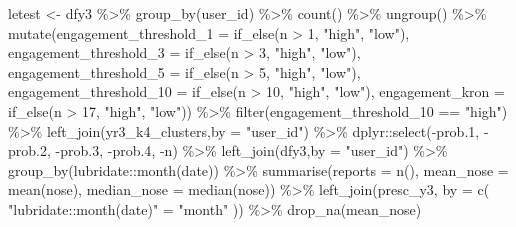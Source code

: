 \documentclass[
]{article}
\newenvironment{Shaded}{\begin{snugshade}}{\end{snugshade}}
\newcommand{\AttributeTok}[1]{\textcolor[rgb]{0.77,0.63,0.00}{#1}}
\newcommand{\DecValTok}[1]{\textcolor[rgb]{0.00,0.00,0.81}{#1}}
\newcommand{\FloatTok}[1]{\textcolor[rgb]{0.00,0.00,0.81}{#1}}
\newcommand{\FunctionTok}[1]{\textcolor[rgb]{0.00,0.00,0.00}{#1}}
\newcommand{\NormalTok}[1]{#1}
\newcommand{\OtherTok}[1]{\textcolor[rgb]{0.56,0.35,0.01}{#1}}
\newcommand{\SpecialCharTok}[1]{\textcolor[rgb]{0.00,0.00,0.00}{#1}}
\newcommand{\StringTok}[1]{\textcolor[rgb]{0.31,0.60,0.02}{#1}}
\begin{document}
\begin{Shaded}
\begin{Highlighting}[]
\NormalTok{ letest }\OtherTok{\textless{}{-}}\NormalTok{  dfy3 }\SpecialCharTok{\%\textgreater{}\%}
   \FunctionTok{group\_by}\NormalTok{(user\_id) }\SpecialCharTok{\%\textgreater{}\%}
   \FunctionTok{count}\NormalTok{() }\SpecialCharTok{\%\textgreater{}\%}
   \FunctionTok{ungroup}\NormalTok{() }\SpecialCharTok{\%\textgreater{}\%} 
   \FunctionTok{mutate}\NormalTok{(}\AttributeTok{engagement\_threshold\_1 =} \FunctionTok{if\_else}\NormalTok{(n }\SpecialCharTok{\textgreater{}} \DecValTok{1}\NormalTok{, }\StringTok{"high"}\NormalTok{, }\StringTok{"low"}\NormalTok{),}
          \AttributeTok{engagement\_threshold\_3 =} \FunctionTok{if\_else}\NormalTok{(n }\SpecialCharTok{\textgreater{}} \DecValTok{3}\NormalTok{, }\StringTok{"high"}\NormalTok{, }\StringTok{"low"}\NormalTok{),}
          \AttributeTok{engagement\_threshold\_5 =} \FunctionTok{if\_else}\NormalTok{(n }\SpecialCharTok{\textgreater{}} \DecValTok{5}\NormalTok{, }\StringTok{"high"}\NormalTok{, }\StringTok{"low"}\NormalTok{),}
          \AttributeTok{engagement\_threshold\_10 =} \FunctionTok{if\_else}\NormalTok{(n }\SpecialCharTok{\textgreater{}} \DecValTok{10}\NormalTok{, }\StringTok{"high"}\NormalTok{, }\StringTok{"low"}\NormalTok{),}
          \AttributeTok{engagement\_kron =} \FunctionTok{if\_else}\NormalTok{(n }\SpecialCharTok{\textgreater{}} \DecValTok{17}\NormalTok{, }\StringTok{"high"}\NormalTok{, }\StringTok{"low"}\NormalTok{)) }\SpecialCharTok{\%\textgreater{}\%} 
   \FunctionTok{filter}\NormalTok{(engagement\_threshold\_10 }\SpecialCharTok{==} \StringTok{"high"}\NormalTok{) }\SpecialCharTok{\%\textgreater{}\%} 
   \FunctionTok{left\_join}\NormalTok{(yr3\_k4\_clusters,}\AttributeTok{by =} \StringTok{"user\_id"}\NormalTok{) }\SpecialCharTok{\%\textgreater{}\%} 
\NormalTok{   dplyr}\SpecialCharTok{::}\FunctionTok{select}\NormalTok{(}\SpecialCharTok{{-}}\NormalTok{prob}\FloatTok{.1}\NormalTok{,}
                 \SpecialCharTok{{-}}\NormalTok{prob}\FloatTok{.2}\NormalTok{,}
                 \SpecialCharTok{{-}}\NormalTok{prob}\FloatTok{.3}\NormalTok{,}
                 \SpecialCharTok{{-}}\NormalTok{prob}\FloatTok{.4}\NormalTok{,}
                 \SpecialCharTok{{-}}\NormalTok{n) }\SpecialCharTok{\%\textgreater{}\%} 
   \FunctionTok{left\_join}\NormalTok{(dfy3,}\AttributeTok{by =} \StringTok{"user\_id"}\NormalTok{) }\SpecialCharTok{\%\textgreater{}\%}  
   \FunctionTok{group\_by}\NormalTok{(lubridate}\SpecialCharTok{::}\FunctionTok{month}\NormalTok{(date)) }\SpecialCharTok{\%\textgreater{}\%}
   \FunctionTok{summarise}\NormalTok{(}\AttributeTok{reports =} \FunctionTok{n}\NormalTok{(),}
             \AttributeTok{mean\_nose =} \FunctionTok{mean}\NormalTok{(nose),}
             \AttributeTok{median\_nose =} \FunctionTok{median}\NormalTok{(nose)) }\SpecialCharTok{\%\textgreater{}\%}
   \FunctionTok{left\_join}\NormalTok{(presc\_y3, }\AttributeTok{by =} \FunctionTok{c}\NormalTok{( }\StringTok{"lubridate::month(date)"} \OtherTok{=} \StringTok{"month"}\NormalTok{ )) }\SpecialCharTok{\%\textgreater{}\%} 
   \FunctionTok{drop\_na}\NormalTok{(mean\_nose) }
 

\end{Highlighting}
\end{Shaded}
\end{document}
